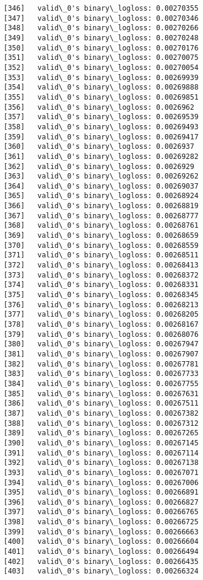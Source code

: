 \documentclass[11pt]{article}
\begin{document}
\begin{Verbatim}[commandchars=\\\{\}]
[346]	valid\_0's binary\_logloss: 0.00270355
[347]	valid\_0's binary\_logloss: 0.00270346
[348]	valid\_0's binary\_logloss: 0.00270266
[349]	valid\_0's binary\_logloss: 0.00270248
[350]	valid\_0's binary\_logloss: 0.00270176
[351]	valid\_0's binary\_logloss: 0.00270075
[352]	valid\_0's binary\_logloss: 0.00270054
[353]	valid\_0's binary\_logloss: 0.00269939
[354]	valid\_0's binary\_logloss: 0.00269888
[355]	valid\_0's binary\_logloss: 0.00269851
[356]	valid\_0's binary\_logloss: 0.0026962
[357]	valid\_0's binary\_logloss: 0.00269539
[358]	valid\_0's binary\_logloss: 0.00269493
[359]	valid\_0's binary\_logloss: 0.00269417
[360]	valid\_0's binary\_logloss: 0.0026937
[361]	valid\_0's binary\_logloss: 0.00269282
[362]	valid\_0's binary\_logloss: 0.0026929
[363]	valid\_0's binary\_logloss: 0.00269262
[364]	valid\_0's binary\_logloss: 0.00269037
[365]	valid\_0's binary\_logloss: 0.00268924
[366]	valid\_0's binary\_logloss: 0.00268819
[367]	valid\_0's binary\_logloss: 0.00268777
[368]	valid\_0's binary\_logloss: 0.00268761
[369]	valid\_0's binary\_logloss: 0.00268659
[370]	valid\_0's binary\_logloss: 0.00268559
[371]	valid\_0's binary\_logloss: 0.00268511
[372]	valid\_0's binary\_logloss: 0.00268413
[373]	valid\_0's binary\_logloss: 0.00268372
[374]	valid\_0's binary\_logloss: 0.00268331
[375]	valid\_0's binary\_logloss: 0.00268345
[376]	valid\_0's binary\_logloss: 0.00268213
[377]	valid\_0's binary\_logloss: 0.00268205
[378]	valid\_0's binary\_logloss: 0.00268167
[379]	valid\_0's binary\_logloss: 0.00268076
[380]	valid\_0's binary\_logloss: 0.00267947
[381]	valid\_0's binary\_logloss: 0.00267907
[382]	valid\_0's binary\_logloss: 0.00267781
[383]	valid\_0's binary\_logloss: 0.00267733
[384]	valid\_0's binary\_logloss: 0.00267755
[385]	valid\_0's binary\_logloss: 0.00267631
[386]	valid\_0's binary\_logloss: 0.00267511
[387]	valid\_0's binary\_logloss: 0.00267382
[388]	valid\_0's binary\_logloss: 0.00267312
[389]	valid\_0's binary\_logloss: 0.00267265
[390]	valid\_0's binary\_logloss: 0.00267145
[391]	valid\_0's binary\_logloss: 0.00267114
[392]	valid\_0's binary\_logloss: 0.00267138
[393]	valid\_0's binary\_logloss: 0.00267071
[394]	valid\_0's binary\_logloss: 0.00267006
[395]	valid\_0's binary\_logloss: 0.00266891
[396]	valid\_0's binary\_logloss: 0.00266827
[397]	valid\_0's binary\_logloss: 0.00266765
[398]	valid\_0's binary\_logloss: 0.00266725
[399]	valid\_0's binary\_logloss: 0.00266663
[400]	valid\_0's binary\_logloss: 0.00266604
[401]	valid\_0's binary\_logloss: 0.00266494
[402]	valid\_0's binary\_logloss: 0.00266435
[403]	valid\_0's binary\_logloss: 0.00266324

\end{Verbatim}
\end{document}
